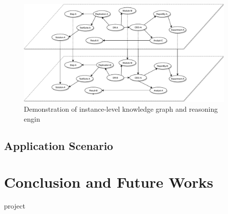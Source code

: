 \documentclass[12pt] {article}
\begin{document}
\begin{figure}[h]
    \centering
    \includegraphics[width=0.95\textwidth]{../figures/KnowledgeGraph.pdf}
    \caption{Demonstration of instance-level knowledge graph and reasoning engin}
    \label{fig:kg}
\end{figure}
\subsection{Application Scenario}

\section{Conclusion and Future Works}


\pagebreak
{project} %
\end{document}
